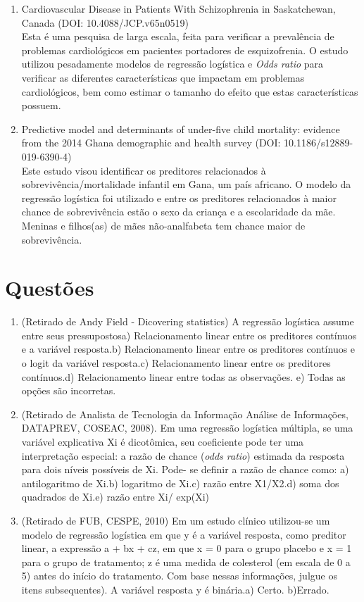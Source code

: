 \documentclass[
]{book}
\begin{document}
\begin{enumerate}
\def\labelenumi{\arabic{enumi}.}
\item
  Cardiovascular Disease in Patients With Schizophrenia in Saskatchewan, Canada (DOI: 10.4088/JCP.v65n0519)\\
  Esta é uma pesquisa de larga escala, feita para verificar a prevalência de problemas cardiológicos em pacientes portadores de esquizofrenia. O estudo utilizou pesadamente modelos de regressão logística e \emph{Odds ratio} para verificar as diferentes características que impactam em problemas cardiológicos, bem como estimar o tamanho do efeito que estas características possuem.
\item
  Predictive model and determinants of under-five child mortality: evidence from the 2014 Ghana demographic and health survey (DOI: 10.1186/s12889-019-6390-4)\\
  Este estudo visou identificar os preditores relacionados à sobrevivência/mortalidade infantil em Gana, um país africano. O modelo da regressão logística foi utilizado e entre os preditores relacionados à maior chance de sobrevivência estão o sexo da criança e a escolaridade da mãe. Meninas e filhos(as) de mães não-analfabeta tem chance maior de sobrevivência.
\end{enumerate}

\hypertarget{questuxf5es-10}{%
\section{Questões}\label{questuxf5es-10}}

\begin{enumerate}
\def\labelenumi{\arabic{enumi}.}
\item
  (Retirado de Andy Field - Dicovering statistics) A regressão logística assume entre seus pressupostosa) Relacionamento linear entre os preditores contínuos e a variável resposta.b) Relacionamento linear entre os preditores contínuos e o logit da variável resposta.c) Relacionamento linear entre os preditores contínuos.d) Relacionamento linear entre todas as observações. e) Todas as opções são incorretas.
\item
  (Retirado de Analista de Tecnologia da Informação Análise de Informações, DATAPREV, COSEAC, 2008). Em uma regressão logística múltipla, se uma variável explicativa Xi é dicotômica, seu coeficiente pode ter uma interpretação especial: a razão de chance (\emph{odds ratio}) estimada da resposta para dois níveis possíveis de Xi. Pode- se definir a razão de chance como: a) antilogaritmo de Xi.b) logaritmo de Xi.c) razão entre X1/X2.d) soma dos quadrados de Xi.e) razão entre Xi/ exp(Xi)
\item
  (Retirado de FUB, CESPE, 2010) Em um estudo clínico utilizou-se um modelo de regressão logística em que y é a variável resposta, como preditor linear, a expressão a + bx + cz, em que x = 0 para o grupo placebo e x = 1 para o grupo de tratamento; z é uma medida de colesterol (em escala de 0 a 5) antes do início do tratamento. Com base nessas informações, julgue os itens subsequentes). A variável resposta y é binária.a) Certo.
  b)Errado.
\end{enumerate}
\end{document}
